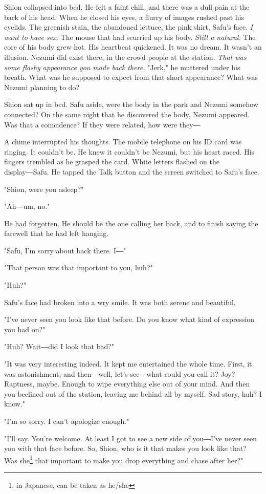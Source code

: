 Shion collapsed into bed. He felt a faint chill, and there was a dull
pain at the back of his head. When he closed his eyes, a flurry of
images rushed past his eyelids. The greenish stain, the abandoned
lettuce, the pink shirt, Safu's face. \emph{I want to have sex.} The mouse that
had scurried up his body. \emph{Still a natural.} The core of his body grew
hot. His heartbeat quickened. It was no dream. It wasn't an illusion.
Nezumi did exist there, in the crowd people at the station. \emph{That was
some flashy appearance you made back there.} "Jerk," he muttered under
his breath. What was he supposed to expect from that short appearance?
What was Nezumi planning to do?

Shion sat up in bed. Safu aside, were the body in the park and Nezumi
somehow connected? On the same night that he discovered the body, Nezumi
appeared. Was that a coincidence? If they were related, how were they―

A chime interrupted his thoughts. The mobile telephone on his ID card
was ringing. It couldn't be. He knew it couldn't be Nezumi, but his
heart raced. His fingers trembled as he grasped the card. White letters
flashed on the display―Safu. He tapped the Talk button and the screen
switched to Safu's face.

"Shion, were you asleep?"

"Ah―um, no."

He had forgotten. He should be the one calling her back, and to finish
saying the farewell that he had left hanging.

"Safu, I'm sorry about back there. I―"

"That person was that important to you, huh?"

"Huh?"

Safu's face had broken into a wry smile. It was both serene and
beautiful.

"I've never seen you look like that before. Do you know what kind of
expression you had on?"

"Huh? Wait―did I look that bad?"

"It was very interesting indeed. It kept me entertained the whole time.
First, it was astonishment, and then―well, let's see―what could you call
it? Joy? Raptness, maybe. Enough to wipe everything else out of your
mind. And then you beelined out of the station, leaving me behind all by
myself. Sad story, huh? I know."

"I'm so sorry. I can't apologize enough."

"I'll say. You're welcome. At least I got to see a new side of you―I've
never seen you with that face before. So, Shion, who is it that makes
you look like that? Was she\footnote{in Japanese, can be taken as he/she} that important to make you drop everything
and chase after her?"

